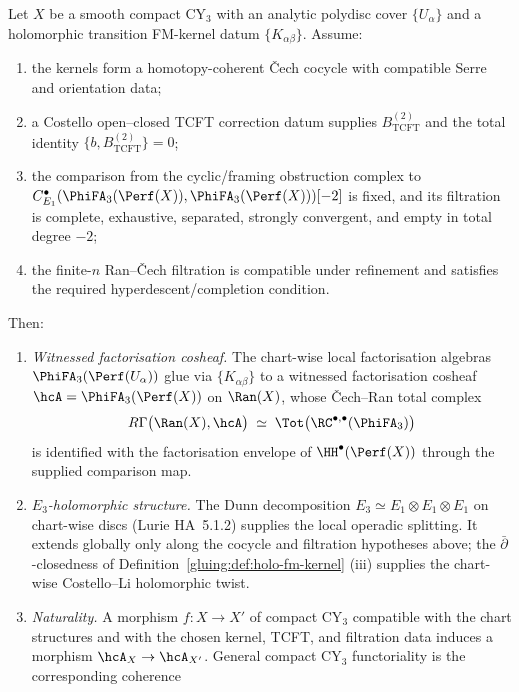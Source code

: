 \begin{theorem}
\label{gluing:thm:phi-fa-3-descent}
Let $X$ be a smooth compact CY$_{3}$ with an analytic polydisc cover
$\{U_{\alpha}\}$ and a holomorphic transition FM-kernel datum
$\{K_{\alpha\beta}\}$. Assume:
\begin{enumerate}[label=\textup{(H\arabic*)},leftmargin=2em]
 \item the kernels form a homotopy-coherent \v{C}ech cocycle with
 compatible Serre and orientation data;
 \item a Costello open--closed TCFT correction datum supplies
 \(B^{(2)}_{\mathrm{TCFT}}\) and the total identity
 \(\{b,B^{(2)}_{\mathrm{TCFT}}\}=0\);
 \item the comparison from the cyclic/framing obstruction complex to
 \(C^\bullet_{E_1}(\PhiFA_3(\Perf(X)),\PhiFA_3(\Perf(X)))[-2]\)
 is fixed, and its filtration is complete, exhaustive, separated,
 strongly convergent, and empty in total degree \(-2\);
 \item the finite-\(n\) Ran--\v{C}ech filtration is compatible under
 refinement and satisfies the required hyperdescent/completion
 condition.
\end{enumerate}
Then:
\begin{enumerate}[leftmargin=2em]
 \item \emph{Witnessed factorisation cosheaf.} The chart-wise local
 factorisation algebras $\PhiFA_{3}(\Perf(U_{\alpha}))$ glue via
 $\{K_{\alpha\beta}\}$ to a witnessed factorisation cosheaf
 $\hcA=\PhiFA_{3}(\Perf(X))$ on $\Ran(X)$, whose \v{C}ech--Ran total
 complex
 \[
 R\Gamma\bigl(\Ran(X),\hcA\bigr)\;\simeq\;
 \Tot\bigl(\RC^{\bullet,\bullet}(\PhiFA_{3})\bigr)
 \]
 is identified with the factorisation envelope of
 $\HH^{\bullet}(\Perf(X))$ through the supplied comparison map.
 \item \emph{$E_{3}$-holomorphic structure.} The Dunn decomposition
 $E_{3}\simeq E_{1}\otimes E_{1}\otimes E_{1}$ on chart-wise discs
 (Lurie HA~5.1.2) supplies the local operadic splitting. It extends
 globally only along the cocycle and filtration hypotheses above; the
 $\bar\partial$-closedness of Definition~\ref{gluing:def:holo-fm-kernel}
 (iii) supplies the chart-wise Costello--Li holomorphic twist.
 \item \emph{Naturality.} A morphism $f:X\to X'$ of compact CY$_{3}$
 compatible with the chart structures and with the chosen kernel,
 TCFT, and filtration data induces a morphism $\hcA_{X}\to\hcA_{X'}$.
 General compact CY$_3$ functoriality is the corresponding coherence

\end{enumerate}
\end{theorem}
